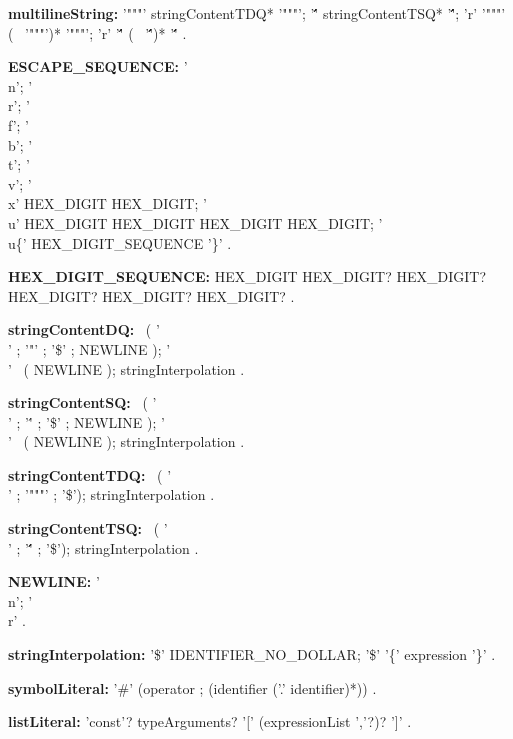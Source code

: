 \begin{grammar}
{\bf multilineString:}
    '"""' stringContentTDQ*   '"""';
    '\'\'\'' stringContentTSQ* '\'\'\'';
    'r' '"""'  (~ '"""')*   '"""';
    'r' '\'\'\'' (~ '\'\'\'')* '\'\'\''
    .

{\bf ESCAPE_SEQUENCE:}
    '\\n';
    '\\r';
    '\\f';
    '\\b';
    '\\t';
    '\\v';
    '\\x' HEX_DIGIT HEX_DIGIT;
    '\\u' HEX_DIGIT HEX_DIGIT HEX_DIGIT HEX_DIGIT;
    '\\u\{' HEX_DIGIT_SEQUENCE '\}'
    .

{\bf HEX_DIGIT_SEQUENCE:}
    HEX_DIGIT HEX_DIGIT? HEX_DIGIT? HEX_DIGIT? HEX_DIGIT? HEX_DIGIT? 
    .
\end{grammar}
\begin{grammar}
{\bf stringContentDQ:}
    ~( '\\' ; '"' ; '\$' ; NEWLINE );
    '\\'  ~( NEWLINE );
    stringInterpolation
    .

{\bf stringContentSQ:}
    ~( '\\' ; '\'' ; '\$' ; NEWLINE );
    '\\'  ~( NEWLINE );
    stringInterpolation
    .

{\bf stringContentTDQ:}
    ~( '\\' ;  '"""' ; '\$');
    stringInterpolation
    .    

{\bf stringContentTSQ:}
    ~( '\\' ; '\'\'\'' ; '\$');
    stringInterpolation
    .

{\bf NEWLINE:}
    '\\n';
    '\\r'
    .
\end{grammar}
\begin{grammar}
{\bf stringInterpolation:}
    '\$' IDENTIFIER_NO_DOLLAR;
    '\$' '\{' expression '\}'
    .
\end{grammar}
\begin{grammar}
{\bf symbolLiteral:}
    '\#'  (operator ; (identifier ('.' identifier)*))
    .
\end{grammar}
\begin{grammar}
{\bf listLiteral:}
    'const'? typeArguments? '[' (expressionList ','?)? ']'
    .
\end{grammar}
